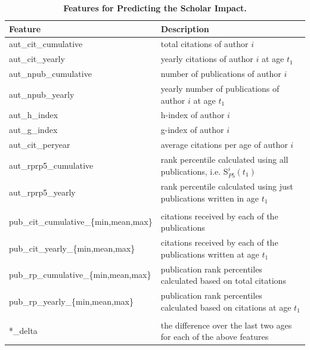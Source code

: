 \begin{refsection}
\begin{table}[htbp]
  \centering
    \begin{tabular}{l|l}
    Feature & Description \\
    \midrule
    aut\_cit\_cumulative & total citations of author $i$ \\
    aut\_cit\_yearly & yearly citations of author $i$ at age $t_1$ \\
    aut\_npub\_cumulative & number of publications of author $i$ \\
    aut\_npub\_yearly & yearly number of publications of author $i$ at age $t_1$ \\
    aut\_h\_index & h-index of author $i$ \\
    aut\_g\_index & g-index of author $i$ \\
    aut\_cit\_peryear & average citations per age of author $i$ \\
    aut\_rprp5\_cumulative & rank percentile calculated using all publications, i.e. S$_{P5}^{i}(t_1)$ \\
    aut\_rprp5\_yearly & rank percentile calculated using just publications written in age $t_1$ \\
          &  \\
    pub\_cit\_cumulative\_\{min,mean,max\} & citations received by each of the publications \\
    pub\_cit\_yearly\_\{min,mean,max\} & citations received by each of the publications written at age $t_1$ \\
    pub\_rp\_cumulative\_\{min,mean,max\} & publication rank percentiles calculated based on total citations \\
    pub\_rp\_yearly\_\{min,mean,max\} & publication rank percentiles calculated based on citations at age $t_1$ \\
          &  \\
    *\_delta & the difference over the last two ages for each of the above features \\
    \end{tabular}%
  \caption{{\bf Features for Predicting the Scholar Impact.}}
  \label{tab:features_autrp}%
\end{table}%





\clearpage

\end{refsection}
